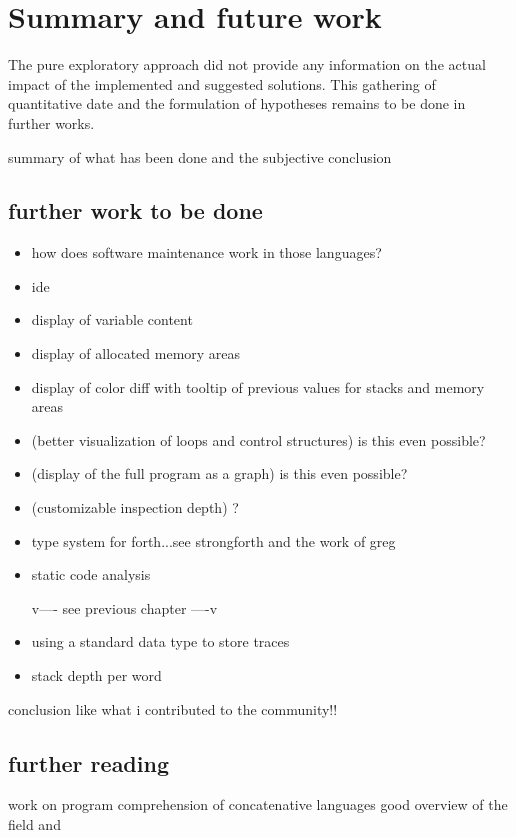 \chapter{Summary and future work}

The pure exploratory approach did not provide any information on the actual impact of the implemented and suggested solutions. This gathering of quantitative date and the formulation of hypotheses remains to be done in further works.

summary of what has been done and the subjective conclusion

\section{further work to be done}

\begin{itemize}
\item how does software maintenance work in those languages?
\item ide
\item display of variable content
\item display of allocated memory areas
\item display of color diff with tooltip of previous values for stacks and memory areas
\item (better visualization of loops and control structures) is this even possible?
\item (display of the full program as a graph) is this even possible?
\item (customizable inspection depth) ?
\item type system for forth...see strongforth and the work of greg

\item static code analysis

v---- see previous chapter ----v
\item using a standard data type to store traces
\item stack depth per word
\end{itemize}

conclusion like what i contributed to the community!!\\

\section{further reading}

work on program comprehension of concatenative languages
good overview of the field \cite{Canfora:2011:ACS:1924421.1924451} and \cite{Cornelissen2009}